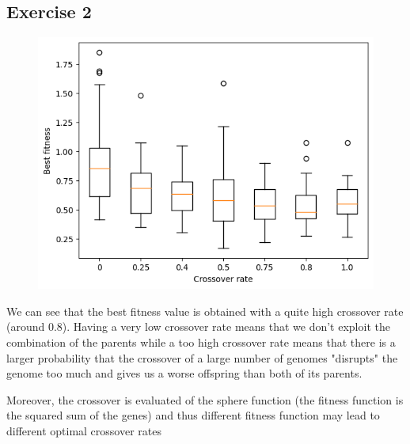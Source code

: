 \subsection{Exercise 2}
\begin{figure}[H]
    \centering
    \includegraphics[width=\linewidth]{images/lab2/comp_cross.png}
\end{figure}
We can see that the best fitness value is obtained with a quite high crossover rate (around 0.8). Having a very low crossover rate means that we don't exploit the combination of the parents while a too high crossover rate means that there is a larger probability that the crossover of a large number of genomes "disrupts" the genome too much and gives us a worse offspring than both of its parents.

Moreover, the crossover is evaluated of the sphere function (the fitness function is the squared sum of the genes) and thus different fitness function may lead to different optimal crossover rates

